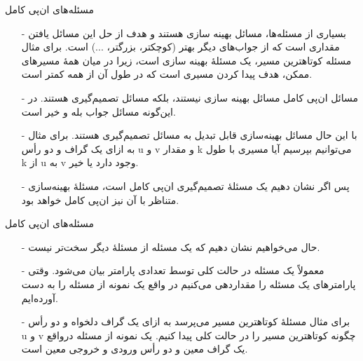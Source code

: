 \begin{frame}{مسئله‌های ان‌پی کامل}
\begin{itemize}\itemr
\item[-]
بسیاری از مسئله‌ها، مسائل بهینه سازی
هستند و هدف از حل این مسائل یافتن مقداری است که از جواب‌های دیگر بهتر (کوچکتر، بزرگتر، ...) است. برای مثال مسئله کوتاهترین مسیر، یک مسئلهٔ بهینه سازی است، زیرا در میان همهٔ مسیرهای ممکن، هدف پیدا کردن مسیری است که در طول آن از همه کمتر است.
\item[-]
مسائل ان‌پی کامل مسائل بهینه سازی نیستند، بلکه مسائل تصمیم‌گیری
هستند. در این‌گونه مسائل جواب بله و خیر است.
\item[-]
با این حال مسائل بهینه‌سازی قابل تبدیل به مسائل تصمیم‌گیری هستند. برای مثال به ازای یک گراف و دو رأس u و v و مقدار k می‌توانیم بپرسیم آیا مسیری با طول k از u به v وجود دارد یا خیر.
\item[-]
پس اگر نشان دهیم یک مسئلهٔ تصمیم‌گیری ان‌پی کامل است، مسئلهٔ بهینه‌سازی متناظر با آن نیز ان‌پی کامل خواهد بود.
\end{itemize}
\end{frame}


\begin{frame}{مسئله‌های ان‌پی کامل}
\begin{itemize}\itemr
\item[-]
حال می‌خواهیم نشان دهیم که یک مسئله از مسئلهٔ دیگر سخت‌تر نیست.
\item[-]
معمولاً یک مسئله در حالت کلی توسط تعدادی پارامتر بیان می‌شود. وقتی پارامترهای یک مسئله را مقداردهی می‌کنیم در واقع یک نمونه
از مسئله را به دست آورده‌ایم.
\item[-]
برای مثال مسئلهٔ کوتاهترین مسیر می‌پرسد به ازای یک گراف دلخواه و دو رأس u و v چگونه کوتاهترین مسیر را در حالت کلی پیدا کنیم. یک نمونه از مسئله درواقع یک گراف معین و دو رأس ورودی و خروجی معین است.
\end{itemize}
\end{frame}



